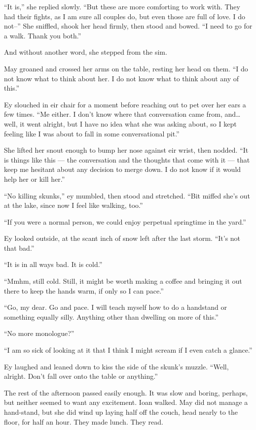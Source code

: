 ``It is,'' she replied slowly. ``But these are more comforting to work with. They had their fights, as I am sure all couples do, but even those are full of love. I do not--'' She sniffled, shook her head firmly, then stood and bowed. ``I need to go for a walk. Thank you both.''

And without another word, she stepped from the sim.

May groaned and crossed her arms on the table, resting her head on them. ``I do not know what to think about her. I do not know what to think about any of this.''

Ey slouched in eir chair for a moment before reaching out to pet over her ears a few times. ``Me either. I don't know where that conversation came from, and\ldots well, it went alright, but I have no idea what she was asking about, so I kept feeling like I was about to fall in some conversational pit.''

She lifted her snout enough to bump her nose against eir wrist, then nodded. ``It is things like this — the conversation and the thoughts that come with it — that keep me hesitant about any decision to merge down. I do not know if it would help her or kill her.''

``No killing skunks,'' ey mumbled, then stood and stretched. ``Bit miffed she's out at the lake, since now I feel like walking, too.''

``If you were a normal person, we could enjoy perpetual springtime in the yard.''

Ey looked outside, at the scant inch of snow left after the last storm. ``It's not that bad.''

``It is in all ways bad. It is cold.''

``Mmhm, still cold. Still, it might be worth making a coffee and bringing it out there to keep the hands warm, if only so I can pace.''

``Go, my dear. Go and pace. I will teach myself how to do a handstand or something equally silly. Anything other than dwelling on more of this.''

``No more monologue?''

``I am so sick of looking at it that I think I might scream if I even catch a glance.''

Ey laughed and leaned down to kiss the side of the skunk's muzzle. ``Well, alright. Don't fall over onto the table or anything.''

The rest of the afternoon passed easily enough. It was slow and boring, perhaps, but neither seemed to want any excitement. Ioan walked. May did not manage a hand-stand, but she did wind up laying half off the couch, head nearly to the floor, for half an hour. They made lunch. They read.

